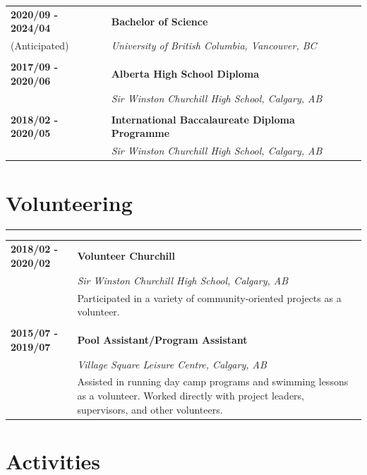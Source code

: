 \documentclass[letterpaper]{article}
\newcommand{\horizontalLine}{%
    \rule{\textwidth}{0.2pt}
    \vspace{1ex}
}
\begin{document}
        \begin{tabular}{p{} p{}} 
            \textbf{2020/09 - 2024/04} & \large\textbf{Bachelor of Science} \\
            (Anticipated) & \emph{University of British Columbia, Vancouver, BC} \\
            \\
            \textbf{2017/09 - 2020/06} & \large\textbf{Alberta High School Diploma} \\
            & \emph{Sir Winston Churchill High School, Calgary, AB} \\
            \\
            \textbf{2018/02 - 2020/05} & \large\textbf{International Baccalaureate Diploma Programme} \\
            & \emph{Sir Winston Churchill High School, Calgary, AB} \\
        \end{tabular}

    \section*{Volunteering}

        \horizontalLine

        \begin{tabular}{p{} p{}} 
            \textbf{2018/02 - 2020/02} & \large\textbf{Volunteer Churchill} \\
            & \emph{Sir Winston Churchill High School, Calgary, AB} \\
            & Participated in a variety of community-oriented projects as a volunteer. \\
            \\
            \textbf{2015/07 - 2019/07} & \large\textbf{Pool Assistant/Program Assistant} \\
            & \emph{Village Square Leisure Centre, Calgary, AB} \\
            & Assisted in running day camp programs and swimming lessons as a volunteer.
            Worked directly with project leaders, supervisors, and other volunteers. \\
        \end{tabular}

    \newpage
    \section*{Activities}
\end{document}
